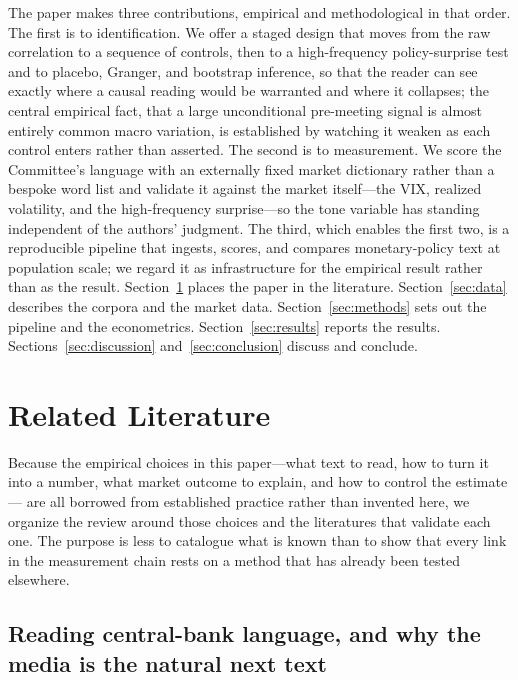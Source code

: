 \documentclass[11pt,a4paper]{article}
\begin{document}
The paper makes three contributions, empirical and methodological in that order.
The first is to identification. We offer a staged design that moves from the raw
correlation to a sequence of controls, then to a high-frequency policy-surprise
test and to placebo, Granger, and bootstrap inference, so that the reader can see
exactly where a causal reading would be warranted and where it collapses; the
central empirical fact, that a large unconditional pre-meeting signal is almost
entirely common macro variation, is established by watching it weaken as each
control enters rather than asserted. The second is to measurement. We score the
Committee's language with an externally fixed market dictionary rather than a
bespoke word list and validate it against the market itself---the VIX, realized
volatility, and the high-frequency surprise---so the tone variable has standing
independent of the authors' judgment. The third, which enables the first two, is a
reproducible pipeline that ingests, scores, and compares monetary-policy text at
population scale; we regard it as infrastructure for the empirical result rather
than as the result. Section~\ref{sec:lit} places the paper in the
literature. Section~\ref{sec:data} describes the corpora and the market data.
Section~\ref{sec:methods} sets out the pipeline and the econometrics.
Section~\ref{sec:results} reports the results. Sections~\ref{sec:discussion}
and~\ref{sec:conclusion} discuss and conclude.

\section{Related Literature}
\label{sec:lit}

Because the empirical choices in this paper---what text to read, how to turn it
into a number, what market outcome to explain, and how to control the estimate---
are all borrowed from established practice rather than invented here, we organize
the review around those choices and the literatures that validate each one. The
purpose is less to catalogue what is known than to show that every link in the
measurement chain rests on a method that has already been tested elsewhere.

\subsection{Reading central-bank language, and why the media is the natural next text}
\end{document}

